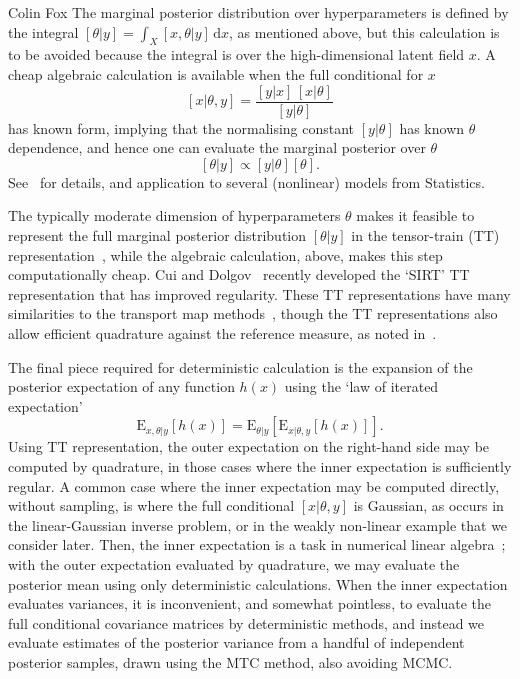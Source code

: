 \documentclass{owrart}
\theoremstyle{plain}
\newcommand{\dd}{\mathrm{d}}
\begin{document}
\begin{talk}{Colin Fox}
The marginal posterior distribution over hyperparameters is defined by the integral $[\theta|y]=\int_X [x,\theta|y]\,\dd x$, as mentioned above, but this calculation is to be avoided because the integral is over the high-dimensional latent field $x$. %
A cheap algebraic calculation is available when the full conditional for $x$
\[ [x | \theta, y] = \frac{[ y | x]\,[ x | \theta ]}{[y|\theta]} \]
has known form, implying that the normalising constant $[y|\theta]$ has known $\theta$ dependence, and hence one can evaluate the marginal posterior over $\theta$
\[ [\theta | y] \propto [ y | \theta][\theta]. \]
See~\cite{norton2018sampling} for details, and application to several (nonlinear) models from Statistics. %

The typically moderate dimension of hyperparameters $\theta$ makes it feasible to represent the full marginal posterior distribution $[\theta | y]$ in the tensor-train (TT) representation~\cite{dolgov2020approximation}, while the algebraic calculation, above, makes this step computationally cheap. Cui and Dolgov~\cite{cui2022deep} recently developed the `SIRT' TT representation %
that has improved regularity. These TT representations have many similarities to the transport map methods~\cite{fox2021solutions}, though the TT representations also allow efficient quadrature against the reference measure, as noted in~\cite{dolgov2020approximation}.

The final piece required for deterministic calculation is the expansion of the posterior expectation of any function $h(x)$ using the  `law of iterated expectation'
\[
\text{E}_{x,\theta |y}\left[ h\left(x \right) \right] = \text{E}_{\theta |y}\left[ \text{E}_{x |\theta,y}\left[ h\left(x \right) \right] \right].
\]
Using TT representation, the outer expectation on the right-hand side may be computed by quadrature, in those cases where the inner expectation is sufficiently regular. A common case where the inner expectation may be computed directly, without sampling, is where the full conditional $[x |\theta,y]$ is Gaussian, as occurs in the linear-Gaussian inverse problem, or in the weakly non-linear example that we consider later. Then, the inner expectation is a task in numerical linear algebra~\cite{fox2016fast,FP2017}; with the outer expectation evaluated by quadrature, we may evaluate the posterior mean using only deterministic calculations. When the inner expectation evaluates variances, it is inconvenient, and somewhat pointless, to evaluate the full conditional covariance matrices by deterministic methods, and instead we evaluate  estimates of the posterior variance from a handful of independent posterior samples, drawn using the MTC method, also avoiding MCMC.


\end{talk}
\end{document}
